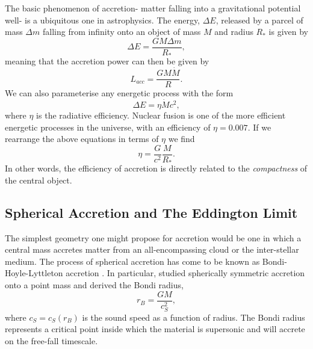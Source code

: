 The basic phenomenon of accretion- matter falling into a gravitational potential well- 
is a ubiquitous one in astrophysics. The energy, $\Delta E$, released by a parcel of 
mass $\Delta m$ falling from infinity onto an object of mass $M$ and radius $R_*$
is given by
\begin{equation}
\Delta E = \frac{GM \Delta m}{R_*},
\label{eq:acc_energy}
\end{equation} 
meaning that the accretion power can then be given by
\begin{equation}
L_{acc} = \frac{GM \dot{M}}{R}.
\label{eq:acc_energy}
\end{equation} 
We can also parameterise any energetic process with the form
\begin{equation}
\Delta E = \eta \dot{M} c^2,
\label{eq:restmass}
\end{equation} 
where $\eta$ is the radiative efficiency. Nuclear fusion is one of the more efficient
energetic processes in the universe, with an efficiency of
$\eta=0.007$. If we rearrange the above equations in terms of $\eta$ we find
\begin{equation}
\eta = \frac{G}{c^2} \frac{M}{R_*}.
\label{eq:eta}
\end{equation} 
In other words, the efficiency of accretion is directly related to the {\em compactness}
of the central object. 

\subsection{Spherical Accretion and The Eddington Limit}
\label{sec:eddington}

The simplest geometry one might propose for accretion
would be one in which a central mass accretes matter from
an all-encompassing cloud or the inter-stellar medium.
The process of spherical accretion has come to be known as 
Bondi-Hoyle-Lyttleton accretion \citep{hoyle1939,bondi1944}.
In particular, \cite{bondi1952} studied spherically symmetric 
accretion onto a point mass and derived the Bondi radius,
\begin{equation}
r_B = \frac{G M}{c_S^2},
\label{eq:bondi}
\end{equation} 
where $c_S = c_S(r_B)$ is the sound speed as a function of radius.
The Bondi radius represents a critical point inside which the material
is supersonic and will accrete on the free-fall timescale.

